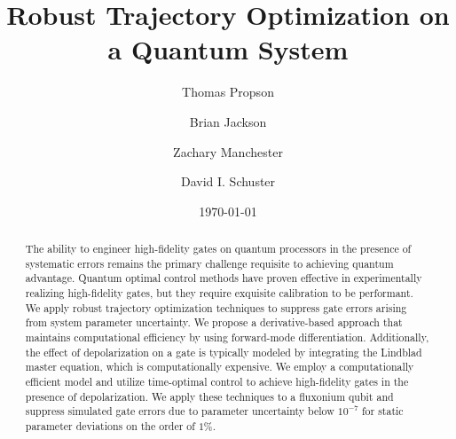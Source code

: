 \title{Robust Trajectory Optimization on a Quantum System}

\author{Thomas Propson}
\author{Brian Jackson}
\author{Zachary Manchester}
\author{David I. Schuster}

\date{\today}

\begin{abstract}
  The ability to engineer high-fidelity gates on quantum processors in the presence of
  systematic errors remains the primary challenge requisite to achieving quantum advantage.
  Quantum optimal control methods have proven effective in experimentally
  realizing high-fidelity gates, but they require exquisite calibration to be performant.
  We apply robust trajectory optimization techniques to suppress gate errors arising from system
  parameter uncertainty.
  We propose a derivative-based approach that maintains
  computational efficiency by using forward-mode differentiation.
  Additionally, the effect of depolarization on a gate is typically modeled by
  integrating the Lindblad master equation,
  which is computationally expensive.
  We employ a computationally efficient model
  and utilize time-optimal control to achieve high-fidelity gates in the presence of depolarization.
  We apply these techniques to a fluxonium qubit and suppress
  simulated gate errors due to parameter uncertainty below $10^{-7}$ for
  static parameter deviations on the order of $1\%$.
\end{abstract}

\maketitle
